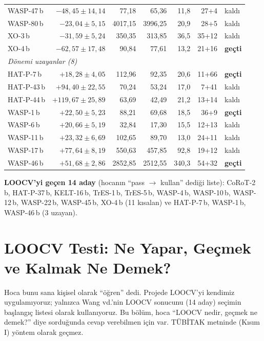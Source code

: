 \begin{center}
\begin{longtable}{l r r r r r l}
WASP-47\,b   & $-48{,}45\pm14{,}14$ & 77,18  & 65,36  & 11,8 & 27+4  & kaldı\\
WASP-80\,b   & $-23{,}04\pm5{,}15$  & 4017,15& 3996,25& 20,9 & 28+5  & kaldı\\
XO-3\,b      & $-31{,}59\pm5{,}24$  & 350,35 & 313,85 & 36,5 & 35+12 & kaldı\\
XO-4\,b      & $-62{,}57\pm17{,}48$ & 90,84  & 77,61  & 13,2 & 21+16 & \textbf{geçti}\\
\midrule
\multicolumn{7}{l}{\emph{Dönemi uzayanlar (8)}}\\
HAT-P-7\,b   & $+18{,}28\pm4{,}05$  & 112,96 & 92,35  & 20,6 & 11+66 & \textbf{geçti}\\
HAT-P-43\,b  & $+94{,}40\pm22{,}55$ & 70,24  & 53,24  & 17,0 & 7+41  & kaldı\\
HAT-P-44\,b  & $+119{,}67\pm25{,}89$& 63,69  & 42,49  & 21,2 & 13+14 & kaldı\\
WASP-1\,b    & $+22{,}50\pm5{,}23$  & 88,21  & 69,68  & 18,5 & 36+9  & \textbf{geçti}\\
WASP-6\,b    & $+20{,}66\pm5{,}19$  & 32,84  & 17,30  & 15,5 & 12+13 & kaldı\\
WASP-11\,b   & $+23{,}32\pm6{,}69$  & 102,65 & 89,70  & 13,0 & 24+11 & kaldı\\
WASP-17\,b   & $+77{,}64\pm8{,}19$  & 550,63 & 457,85 & 92,8 & 19+12 & kaldı\\
WASP-46\,b   & $+51{,}68\pm2{,}86$  & 2852,85& 2512,55& 340,3& 54+32 & \textbf{geçti}\\
\bottomrule
\end{longtable}
\end{center}

\textbf{LOOCV'yi geçen 14 aday} (hocanın “pass $\rightarrow$ kullan” dediği liste):
CoRoT-2\,b, HAT-P-37\,b, KELT-16\,b, TrES-1\,b, TrES-5\,b, WASP-4\,b, WASP-10\,b, WASP-12\,b, WASP-22\,b,
WASP-45\,b, XO-4\,b (11 kısalan) ve HAT-P-7\,b, WASP-1\,b, WASP-46\,b (3 uzayan).

\section{LOOCV Testi: Ne Yapar, Geçmek ve Kalmak Ne Demek?}
\label{sec:loocv}

\begin{hoca}
Hoca bunu sana kişisel olarak “öğren” dedi. Projede LOOCV'yi kendimiz uygulamıyoruz; yalnızca Wang vd.'nin LOOCV
sonucunu (14 aday) seçimin başlangıç listesi olarak kullanıyoruz. Bu bölüm, hoca “LOOCV nedir, geçmek ne demek?”
diye sorduğunda cevap verebilmen için var. TÜBİTAK metninde (Kısım I) yöntem olarak geçmez.
\end{hoca}

